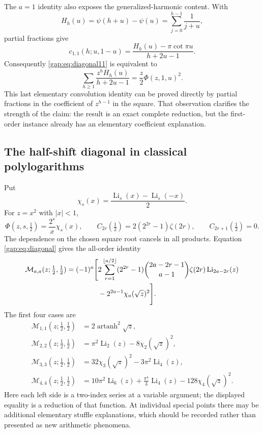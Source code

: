 The $a=1$ identity also exposes the generalized-harmonic content.
With
\[
 H_h(u)=\psi(h+u)-\psi(u)=\sum_{j=0}^{h-1}\frac1{j+u},
\]
partial fractions give
\[
 c_{1,1}(h;u,1-u)
 =\frac{H_h(u)-\pi\cot\pi u}{h+2u-1}.
\]
Consequently \eqref{gap:eq:diagonal11} is equivalent to
\begin{equation}\label{gap:eq:harmonic-convolution}
 \sum_{h\geq1}\frac{z^h H_h(u)}{h+2u-1}
       =\frac z2\Phi(z,1,u)^2.
\end{equation}
This last elementary convolution identity can be proved directly by
partial fractions in the coefficient of $z^{h-1}$ in the square.
That observation clarifies the strength of the claim: the result is
an exact complete reduction, but the first-order instance already has
an elementary coefficient explanation.

\subsection{The half-shift diagonal in classical polylogarithms}

Put
\[
 \chi_s(x)=\frac{\operatorname{Li}_s(x)-\operatorname{Li}_s(-x)}2.
\]
For $z=x^2$ with $|x|<1$,
\[
 \Phi(z,s,\tfrac12)=\frac{2^s}{x}\chi_s(x),\qquad
 C_{2r}(\tfrac12)=2(2^{2r}-1)\zeta(2r),\qquad
 C_{2r+1}(\tfrac12)=0.
\]
The dependence on the chosen square root cancels in all products.
Equation \eqref{gap:eq:diagonal} gives the all-order identity
\begin{align}
 \mathcal M_{a,a}(z;\tfrac12,\tfrac12)
 =(-1)^a\Bigg[
 &2\sum_{r=1}^{\lfloor a/2\rfloor}
   (2^{2r}-1)\binom{2a-2r-1}{a-1}\zeta(2r)
                         \operatorname{Li}_{2a-2r}(z)\notag\\
 &-2^{2a-1}\chi_a(\sqrt z)^2\Bigg].
 \label{gap:eq:half-all}
\end{align}
The first four cases are
\begin{align}
 \mathcal M_{1,1}(z;\tfrac12,\tfrac12)
   &=2\operatorname{artanh}^2\sqrt z,\label{gap:eq:half11}\\
 \mathcal M_{2,2}(z;\tfrac12,\tfrac12)
   &=\pi^2\operatorname{Li}_2(z)-8\chi_2(\sqrt z)^2,
      \label{gap:eq:half22}\\
 \mathcal M_{3,3}(z;\tfrac12,\tfrac12)
   &=32\chi_3(\sqrt z)^2-3\pi^2\operatorname{Li}_4(z),
      \label{gap:eq:half33}\\
 \mathcal M_{4,4}(z;\tfrac12,\tfrac12)
   &=10\pi^2\operatorname{Li}_6(z)
       +\frac{\pi^4}{3}\operatorname{Li}_4(z)
       -128\chi_4(\sqrt z)^2.
      \label{gap:eq:half44}
\end{align}
Here each left side is a two-index series at a variable
argument; the displayed equality is a reduction of that function.
At individual special points there may be additional elementary
stuffle explanations, which should be recorded rather than presented
as new arithmetic phenomena.

